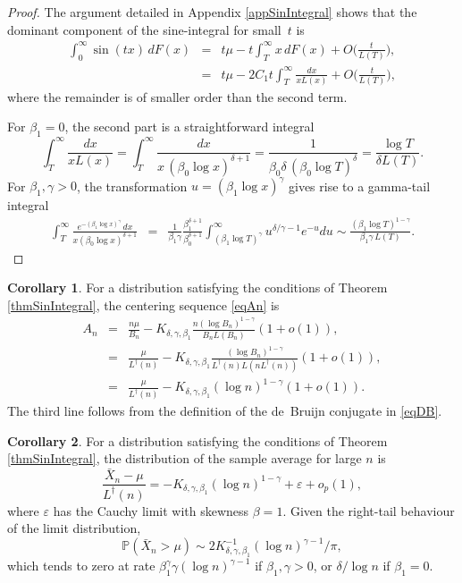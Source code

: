 \documentclass[11pt]{article}
\theoremstyle{definition}
\newtheorem{corollary}{Corollary}[section]
\def\Prob{{\mathbb P}}
\begin{document}
\begin{proof}
	The argument detailed in Appendix \ref{appSinIntegral} shows that the dominant component of the sine-integral for small~$t$ is
	\begin{eqnarray*}
		\int_0^\infty \sin(tx)\, dF(x) &=& t \mu - t \int_T^\infty x \, dF(x)  + O\biggl(\frac t {L(T)} \biggr), \\
		&=& t \mu - 2C_1 t \int_T^\infty \frac{dx}{xL(x)}  + O\biggl(\frac t {L(T)} \biggr),
	\end{eqnarray*}
	where the remainder is of smaller order than the second term.
	
	For $\beta_1 = 0$, the second part is a straightforward integral
	\[
	\int_T^\infty \frac{dx}{xL(x)}=
	\int_T^\infty \frac {dx}{x\, (\beta_0\log x)^{\delta + 1}} = \frac1 {\beta_0\delta\,(\beta_0\log T)^\delta} = 
	\frac{\log T}{\delta L(T)}.
	\]
	For $\beta_1, \gamma > 0$, the transformation $u = (\beta_1\log x)^\gamma$ gives rise to a gamma-tail integral
	\begin{eqnarray*}
		\int_T^\infty \frac {e^{-(\beta_1\log x)^\gamma}\, dx} {x (\beta_0\log x)^{\delta+1} }
		&=&  \frac{1}{\beta_1 \gamma} \frac{\beta_1^{\delta+1}}{\beta_{0}^{\delta+1}} \int_{(\beta_1 \log T)^\gamma}^\infty u^{\delta/\gamma -1} e^{-u} du
		\sim \frac{(\beta_1 \log T)^{1-\gamma}} {\beta_1 \gamma\, L(T)}.
	\end{eqnarray*}
\end{proof}




\begin{corollary}\label{corollAn}
	For a distribution satisfying the conditions of Theorem \ref{thmSinIntegral}, the centering sequence \eqref{eqAn} is 
	\begin{eqnarray*}
		A_n &=& \frac {n \mu} {B_n} - K_{\delta,\gamma,\beta_1}  \frac{n (\log B_n)^{1-\gamma}}  {B_n L(B_n)} (1 + o(1)),\\
		&=& \frac {\mu} {L^\dagger(n)} - K_{\delta,\gamma,\beta_1}  \frac{(\log B_n)^{1-\gamma}} {L^\dagger(n) L(n L^\dagger(n))}(1 + o(1)), \\
		&=& \frac {\mu} {L^\dagger(n)} - K_{\delta,\gamma,\beta_1}(\log n)^{1-\gamma} (1 + o(1)).
	\end{eqnarray*}
	The third line follows from the definition of the de~Bruijn conjugate in \eqref{eqDB}.
\end{corollary}



\begin{corollary}\label{corollXbar}
	For a distribution satisfying the conditions of Theorem \ref{thmSinIntegral}, the distribution of the sample average for large $n$ is
	\[
	\frac{\bar X_n - \mu} {L^\dagger(n)} = - K_{\delta,\gamma,\beta_1}  (\log n)^{1-\gamma} + \varepsilon + o_p(1),
	\]
	where $\varepsilon$ has the Cauchy limit with skewness $\beta=1$.
	Given the right-tail behaviour of the limit distribution,
	\[
	\Prob(\bar X_n > \mu) \sim 2 K_{\delta,\gamma,\beta_1}^{-1} (\log n)^{\gamma-1} / \pi, 
	\]
	which tends to zero at rate $\beta_1^\gamma \gamma (\log n)^{\gamma-1}$ if $\beta_1,\gamma > 0$, or $\delta/\log n$ if $\beta_1=0$.
\end{corollary}
\end{document}
